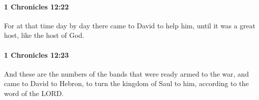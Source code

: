 		\paragraph{1 Chronicles 12:22} %
			\label{1CHRONICLES-12-22}

			For at that time day by day there came to David to help him, until it was a great host, like the host of God.


		\paragraph{1 Chronicles 12:23} %
			\label{1CHRONICLES-12-23}

			And these are the numbers of the bands that were ready armed to the war, and came to David to Hebron, to turn the kingdom of Saul to him, according to the word of the LORD.


